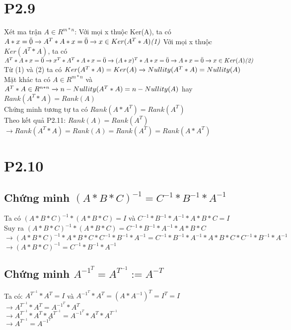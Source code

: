 \documentclass[a4paper,11pt]{article}
\theoremstyle{mytheor}
\begin{document}
\section*{P2.9}
Xét ma trận $A \in R^{m*n}$:
Với mọi x thuộc Ker(A), ta có $ A*x = \bar{0}\\
    \xrightarrow{} A^T*A*x = \bar{0}\\
    \xrightarrow{} x \in Ker(A^T*A) \hfill \textit{(1)} \\
$
Với mọi x thuộc $Ker(A^T*A)$, ta có $ A^T*A*x = \bar{0}\\
    \xrightarrow{} x^T*A^T*A*x = \bar{0}\\
    \xrightarrow{} (A*x)^T*A*x = \bar{0}\\
    \xrightarrow{} A*x = \bar{0}\\
    \xrightarrow{} x \in Ker(A) \hfill \textit{(2)}\\ 
$
Từ (1) và (2) ta có $Ker(A^T*A) = Ker(A) \\ 
\xrightarrow{} Nullity(A^T*A) = Nullity(A)$\\
Mặt khác ta có $A \in R^{m*n}$ và $A^T*A \in R^{n*n} \\ 
\xrightarrow{} n - Nullity(A^T*A) = n - Nullity(A)$ hay $Rank(A^T*A) = Rank(A)$\\
Chứng minh tương tự ta có $Rank(A*A^T) = Rank(A^T)$\\
Theo kết quả P2.11: $Rank(A) = Rank(A^T)$\\
$\xrightarrow{} Rank (A^T*A) = Rank(A) = Rank(A^T) = Rank(A*A^T)$

\section*{P2.10}
\subsection*{Chứng minh $(A*B*C)^{-1}=C^{-1}*B^{-1}*A^{-1}$}
Ta có $(A*B*C)^{-1}*(A*B*C) = I$ và $C^{-1}*B^{-1}*A^{-1}*A*B*C = I$\\
Suy ra $(A*B*C)^{-1}*(A*B*C) = C^{-1}*B^{-1}*A^{-1}*A*B*C$\\
$\xrightarrow{}(A*B*C)^{-1}*A*B*C*C^{-1}*B^{-1}*A^{-1} = C^{-1}*B^{-1}*A^{-1}*A*B*C*C^{-1}*B^{-1}*A^{-1}$\\
$\xrightarrow{}(A*B*C)^{-1}=C^{-1}*B^{-1}*A^{-1}$
\subsection*{Chứng minh $A^{-1^T} = A^{T^{-1}} := A^{-T}$}
Ta có: $A^{T^{-1}}*A^T=I$ và $A^{-1^T}*A^T= (A*A^{-1})^T = I^T = I$ \\
$\xrightarrow{}A^{T^{-1}}*A^T = A^{-1^T}*A^T$ \\
$\xrightarrow{}A^{T^{-1}}*A^T*A^{T^{-1}} = A^{-1^T}*A^T*A^{T^{-1}}$ \\
$\xrightarrow{}A^{T^{-1}} = A^{-1^T}$ 
\end{document}

